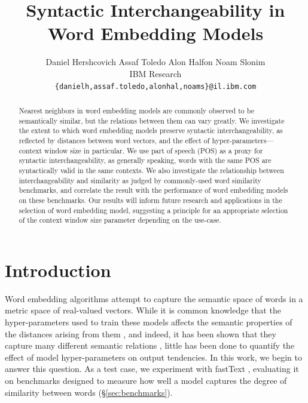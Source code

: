\documentclass[11pt,a4paper]{article}
\title{Syntactic Interchangeability in Word Embedding Models}
\author{
Daniel Hershcovich \qquad Assaf Toledo \qquad Alon Halfon \qquad Noam Slonim \\
IBM Research\\
\texttt{\{danielh,assaf.toledo,alonhal,noams\}@il.ibm.com}
}
\begin{document}
    \maketitle

    \begin{abstract}
    Nearest neighbors in word embedding models are commonly observed to be
    semantically similar, but the relations between them can vary greatly.
    We investigate the extent to which word embedding models
    preserve syntactic interchangeability, as reflected by distances between
    word vectors, and the effect of hyper-parameters---context window size in particular.
    We use part of speech (POS) as a proxy for syntactic interchangeability,
    as generally speaking, words with the same POS are syntactically valid in the same contexts.
    We also investigate the relationship between interchangeability
    and similarity as judged by commonly-used word similarity benchmarks,
    and correlate the result with the performance of word embedding models
    on these benchmarks.
    Our results will inform future research and applications in the selection
    of word embedding model, suggesting a principle for an appropriate selection
    of the context window size parameter depending on the use-case.
    \end{abstract}

    \section{Introduction}\label{sec:introduction}

    Word embedding algorithms \cite{mikolov2013efficient,pennington2014glove,levy2015improving}
    attempt to capture the semantic space of words
    in a metric space of real-valued vectors.
    While it is common knowledge that the hyper-parameters used to train these
    models affects the semantic properties of the distances arising from them
    \cite{bansal2014tailoring,lin2015unsupervised,goldberg2016primer},
    and indeed, it has been shown that
    they capture many different semantic relations \cite{yang2006verb,agirre2009study},
    little has been done to quantify the
    effect of model hyper-parameters on output tendencies.
    In this work, we begin to answer this question.
    As a test case, we experiment with fastText \cite{bojanowski2016enriching},
    evaluating it on benchmarks designed to measure how well a model captures the degree
    of similarity between words (\S\ref{sec:benchmarks}).
    
\end{document}
